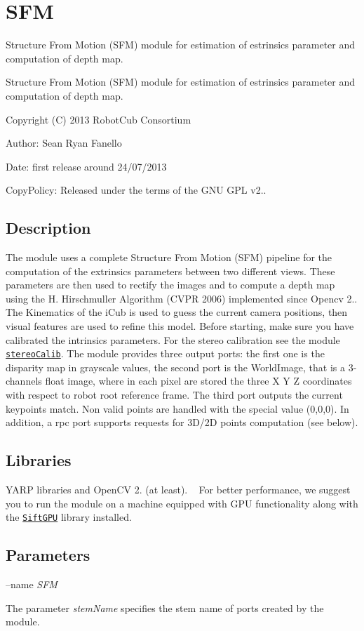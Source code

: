 \section{S\+F\+M}
\label{group__SFM}


Structure From Motion (S\+F\+M) module for estimation of estrinsics parameter and computation of depth map.  


Structure From Motion (S\+F\+M) module for estimation of estrinsics parameter and computation of depth map. 

Copyright (C) 2013 Robot\+Cub Consortium

Author\+: Sean Ryan Fanello

Date\+: first release around 24/07/2013

Copy\+Policy\+: Released under the terms of the G\+N\+U G\+P\+L v2..\hypertarget{group__SFM_intro_sec}{}\subsection{Description}\label{group__SFM_intro_sec}
The module uses a complete Structure From Motion (S\+F\+M) pipeline for the computation of the extrinsics parameters between two different views. These parameters are then used to rectify the images and to compute a depth map using the H. Hirschmuller Algorithm (C\+V\+P\+R 2006) implemented since Opencv 2.. The Kinematics of the i\+Cub is used to guess the current camera positions, then visual features are used to refine this model. Before starting, make sure you have calibrated the intrinsics parameters. For the stereo calibration see the module \href{http://wiki.icub.org/iCub/main/dox/html/group__icub__stereoCalib.html}{\tt stereo\+Calib}. The module provides three output ports\+: the first one is the disparity map in grayscale values, the second port is the World\+Image, that is a 3-\/channels float image, where in each pixel are stored the three X Y Z coordinates with respect to robot root reference frame. The third port outputs the current keypoints match. Non valid points are handled with the special value (0,0,0). In addition, a rpc port supports requests for 3\+D/2\+D points computation (see below).\hypertarget{group__SFM_lib_sec}{}\subsection{Libraries}\label{group__SFM_lib_sec}
Y\+A\+R\+P libraries and Open\+C\+V 2. (at least). ~\newline
For better performance, we suggest you to run the module on a machine equipped with G\+P\+U functionality along with the \href{http://cs.unc.edu/~ccwu/siftgpu}{\tt Sift\+G\+P\+U} library installed.\hypertarget{group__SFM_parameters_sec}{}\subsection{Parameters}\label{group__SFM_parameters_sec}
--name {\itshape S\+F\+M} 
\begin{DoxyItemize}
\item The parameter {\itshape stem\+Name} specifies the stem name of ports created by the module.
\end{DoxyItemize}


